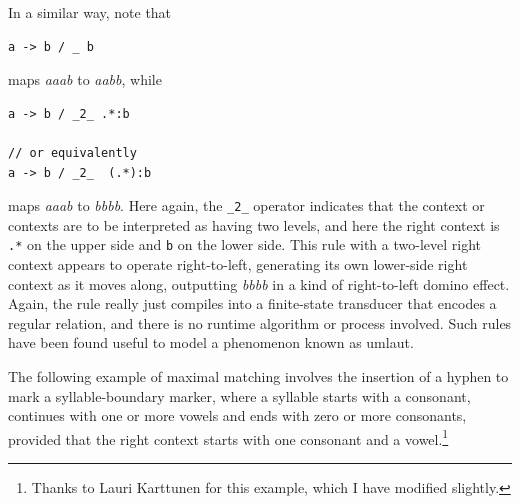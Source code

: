 In a similar way, note that

\begin{Verbatim}
a -> b / _ b
\end{Verbatim}

\noindent
maps \emph{aaab} to \emph{aabb}, while

\begin{Verbatim}
a -> b / _2_ .*:b

// or equivalently
a -> b / _2_  (.*):b
\end{Verbatim}

\noindent
maps \emph{aaab} to \emph{bbbb}.  Here again, the \verb!_2_! operator indicates that the context or contexts are to
be interpreted as having two levels, and here the right context is \verb!.*! on the upper side and \verb!b! on the lower
side.  This rule with a two-level right context appears to
operate right-to-left, generating its own lower-side right context as it
moves along, outputting \emph{bbbb} in a kind
of right-to-left domino effect.
Again, the rule really just compiles into a finite-state transducer that encodes a regular
relation, and there is no runtime algorithm or process involved.
Such rules have been found useful to model a phenomenon known as umlaut.

The following example of maximal matching involves the insertion of a hyphen to mark a syllable-boundary
marker, where a syllable starts with a
consonant, continues with one or more vowels and ends with zero or more consonants,
provided that the right context starts with one consonant and a
vowel.\footnote{Thanks to
Lauri Karttunen for this example, which I have modified slightly.}

